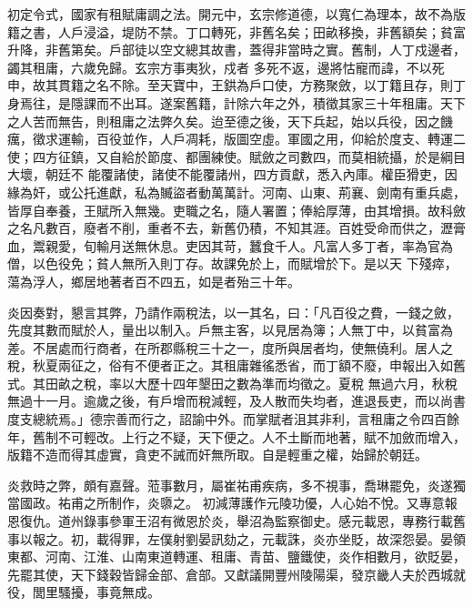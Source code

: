 \begin{pinyinscope}
 初定令式，國家有租賦庸調之法。開元中，玄宗修道德，以寬仁為理本，故不為版籍之書，人戶浸溢，堤防不禁。丁口轉死，非舊名矣；田畝移換，非舊額矣；貧富升降，非舊第矣。戶部徒以空文總其故書，蓋得非當時之實。舊制，人丁戍邊者，蠲其租庸，六歲免歸。玄宗方事夷狄，戍者
 多死不返，邊將怙寵而諱，不以死申，故其貫籍之名不除。至天寶中，王鉷為戶口使，方務聚斂，以丁籍且存，則丁身焉往，是隱課而不出耳。遂案舊籍，計除六年之外，積徵其家三十年租庸。天下之人苦而無告，則租庸之法弊久矣。迨至德之後，天下兵起，始以兵役，因之饑癘，徵求運輸，百役並作，人戶凋耗，版圖空虛。軍國之用，仰給於度支、轉運二使；四方征鎮，又自給於節度、都團練使。賦斂之司數四，而莫相統攝，於是綱目大壞，朝廷不
 能覆諸使，諸使不能覆諸州，四方貢獻，悉入內庫。權臣猾吏，因緣為奸，或公托進獻，私為贓盜者動萬萬計。河南、山東、荊襄、劍南有重兵處，皆厚自奉養，王賦所入無幾。吏職之名，隨人署置；俸給厚薄，由其增損。故科斂之名凡數百，廢者不削，重者不去，新舊仍積，不知其涯。百姓受命而供之，瀝膏血，鬻親愛，旬輸月送無休息。吏因其苛，蠶食千人。凡富人多丁者，率為官為僧，以色役免；貧人無所入則丁存。故課免於上，而賦增於下。是以天
 下殘瘁，蕩為浮人，鄉居地著者百不四五，如是者殆三十年。



 炎因奏對，懇言其弊，乃請作兩稅法，以一其名，曰：「凡百役之費，一錢之斂，先度其數而賦於人，量出以制入。戶無主客，以見居為簿；人無丁中，以貧富為差。不居處而行商者，在所郡縣稅三十之一，度所與居者均，使無僥利。居人之稅，秋夏兩征之，俗有不便者正之。其租庸雜徭悉省，而丁額不廢，申報出入如舊式。其田畝之稅，率以大歷十四年墾田之數為準而均徵之。夏稅
 無過六月，秋稅無過十一月。逾歲之後，有戶增而稅減輕，及人散而失均者，進退長吏，而以尚書度支總統焉。」德宗善而行之，詔諭中外。而掌賦者沮其非利，言租庸之令四百餘年，舊制不可輕改。上行之不疑，天下便之。人不土斷而地著，賦不加斂而增入，版籍不造而得其虛實，貪吏不誡而奸無所取。自是輕重之權，始歸於朝廷。



 炎救時之弊，頗有嘉聲。蒞事數月，屬崔祐甫疾病，多不視事，喬琳罷免，炎遂獨當國政。祐甫之所制作，炎隳之。
 初減薄護作元陵功優，人心始不悅。又專意報恩復仇。道州錄事參軍王沼有微恩於炎，舉沼為監察御史。感元載恩，專務行載舊事以報之。初，載得罪，左僕射劉晏訊劾之，元載誅，炎亦坐貶，故深怨晏。晏領東都、河南、江淮、山南東道轉運、租庸、青苗、鹽鐵使，炎作相數月，欲貶晏，先罷其使，天下錢穀皆歸金部、倉部。又獻議開豐州陵陽渠，發京畿人夫於西城就役，閭里騷擾，事竟無成。




\end{pinyinscope}

